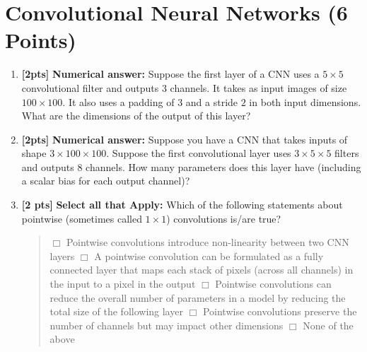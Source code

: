 \section{Convolutional Neural Networks (6 Points)}

\begin{enumerate}

\item \textbf{[2pts]} \textbf{Numerical answer:} Suppose the first layer of a CNN uses a $5 \times 5$ convolutional filter and outputs 3 channels. It takes as input images of size $100 \times 100$. It also uses a padding of $3$ and a stride $2$ in both input dimensions. What are the dimensions of the output of this layer?

\begin{tcolorbox}[fit,height=1cm, width=8cm, blank, borderline={1pt}{-2pt},nobeforeafter]
\begin{answer}
\end{answer}
\end{tcolorbox}

\item \textbf{[2pts]} \textbf{Numerical answer:} Suppose you have a CNN that takes inputs of shape $3 \times 100 \times 100$. Suppose the first convolutional layer uses $3\times 5 \times 5$ filters and outputs $8$ channels. How many parameters does this layer have (including a scalar bias for each output channel)?

\begin{tcolorbox}[fit,height=1cm, width=8cm, blank, borderline={1pt}{-2pt},nobeforeafter]
\begin{answer}
\end{answer}
\end{tcolorbox}


\item \textbf{[2 pts]} \textbf{Select all that Apply:} Which of the following statements about pointwise (sometimes called $1\times 1$) convolutions is/are true?
\begin{quote}
    $\Box$ Pointwise convolutions introduce non-linearity between two CNN layers \newline
    $\Box$ A pointwise convolution can be formulated as a fully connected layer that maps each stack of pixels (across all channels) in the input to a pixel in the output
    \newline
    $\Box$ Pointwise convolutions can reduce the overall number of parameters in a model by reducing the total size of the following layer 
    \newline
    $\Box$ Pointwise convolutions preserve the number of channels but may impact other dimensions \newline
    $\Box$ None of the above
\end{quote}


\end{enumerate}

